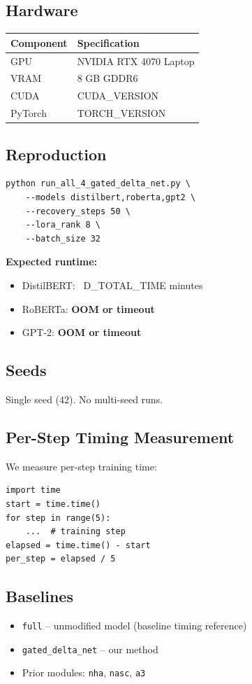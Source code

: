 \subsection{Hardware}

\begin{table}[H]
\centering
\small
\begin{tabular}{ll}
\toprule
\textbf{Component} & \textbf{Specification} \\
\midrule
GPU & NVIDIA RTX 4070 Laptop \\
VRAM & 8 GB GDDR6 \\
CUDA & {{CUDA\_VERSION}} \\
PyTorch & {{TORCH\_VERSION}} \\
\bottomrule
\end{tabular}
\end{table}

\subsection{Reproduction}

\begin{lstlisting}
python run_all_4_gated_delta_net.py \
    --models distilbert,roberta,gpt2 \
    --recovery_steps 50 \
    --lora_rank 8 \
    --batch_size 32
\end{lstlisting}

\textbf{Expected runtime:}
\begin{itemize}
\item DistilBERT: ~{{D\_TOTAL\_TIME}} minutes
\item RoBERTa: \textbf{OOM or timeout}
\item GPT-2: \textbf{OOM or timeout}

\end{itemize}
\subsection{Seeds}

Single seed (42). No multi-seed runs.

\subsection{Per-Step Timing Measurement}

We measure per-step training time:

\begin{lstlisting}
import time
start = time.time()
for step in range(5):
    ...  # training step
elapsed = time.time() - start
per_step = elapsed / 5
\end{lstlisting}

\subsection{Baselines}

\begin{itemize}
\item \texttt{full} -- unmodified model (baseline timing reference)
\item \texttt{gated\_delta\_net} -- our method
\item Prior modules: \texttt{nha}, \texttt{nasc}, \texttt{a3}

\end{itemize}
